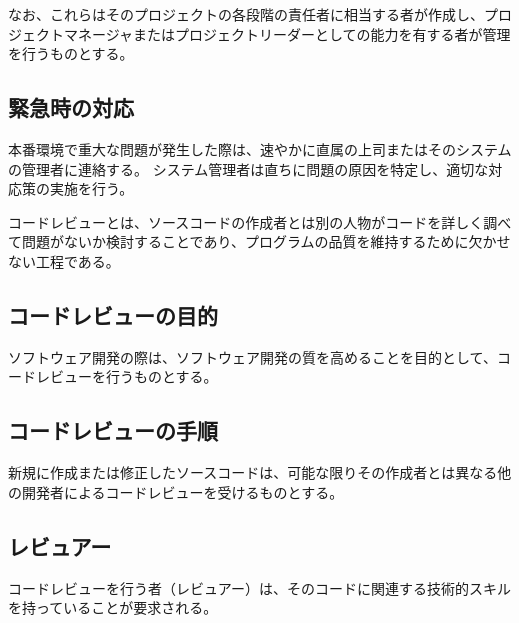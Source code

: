 なお、これらはそのプロジェクトの各段階の責任者に相当する者が作成し、プロジェクトマネージャまたはプロジェクトリーダーとしての能力を有する者が管理を行うものとする。

\subsection{緊急時の対応}
本番環境で重大な問題が発生した際は、速やかに直属の上司またはそのシステムの管理者に連絡する。
システム管理者は直ちに問題の原因を特定し、適切な対応策の実施を行う。



\clearpage
コードレビューとは、ソースコードの作成者とは別の人物がコードを詳しく調べて問題がないか検討することであり、プログラムの品質を維持するために欠かせない工程である。

\subsection{コードレビューの目的}
ソフトウェア開発の際は、ソフトウェア開発の質を高めることを目的として、コードレビューを行うものとする。

\subsection{コードレビューの手順}
新規に作成または修正したソースコードは、可能な限りその作成者とは異なる他の開発者によるコードレビューを受けるものとする。

\subsection{レビュアー}
コードレビューを行う者（レビュアー）は、そのコードに関連する技術的スキルを持っていることが要求される。

